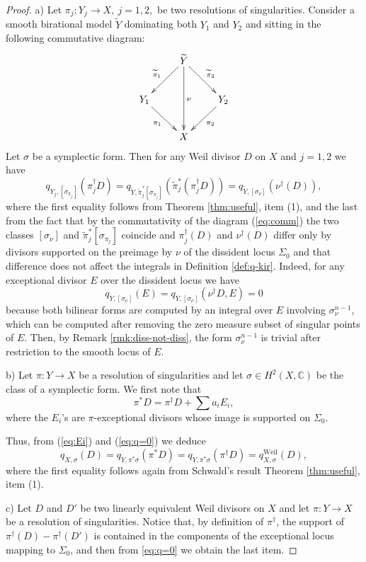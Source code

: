 \documentclass[12pt,reqno]{amsart}
\def\tilde{\widetilde}
\theoremstyle{plain}
\theoremstyle{definition}
\begin{document}
\begin{proof}
a) Let $\pi_j :Y_j\to X,\ j=1,2,$ be two resolutions of singularities. Consider a smooth birational model $\tilde Y$
dominating both $Y_1$ and $Y_2$ and sitting in the following commutative diagram:
\begin{equation}\label{eq:comm}
\xymatrix{
& \tilde Y \ar[dr]^{\tilde\pi_2}\ar[dl]_{\tilde\pi_1}\ar[dd]^{\nu} & \\
Y_1\ar[dr]_{\pi_1} & &Y_2\ar[dl]^{\pi_2}\\
& X &}
\end{equation}
Let $\sigma$ be a symplectic form.
Then for any Weil divisor $D$ on $X$ and $j=1,2$ we have
$$
q_{Y_j,[\sigma_{\pi_j}]}(\pi_j^{\dagger}D )=
q_{\tilde Y,\tilde\pi_j^*[\sigma_{\pi_j}]}(\tilde\pi_j^*(\pi_j^{\dagger}D))=
q_{\tilde Y,[\sigma_{\nu}]}(\nu^{\dagger}(D)),
$$
where the first equality follows from  Theorem \ref{thm:useful}, item (1), and the last from the fact that by the commutativity of the diagram (\ref{eq:comm}) the two classes 
$[\sigma_{\nu}]$ and $\tilde\pi_j^*[\sigma_{\pi_j}]$ coincide and $\pi_j^{\dagger}(D)$ and $\nu^{\dagger}(D)$ differ only by divisors supported on the preimage by $\nu$ of the dissident locus $\Sigma_0$ and that difference does not affect the integrals in Definition \ref{def:q-kir}.
Indeed, for any exceptional divisor $E$ over the dissident locus we have
\begin{equation}\label{eq:q=0}
q_{Y, [\sigma_{\nu}]}(E)= q_{Y, [\sigma_{\nu}]}(\nu^{\dagger}D, E) = 0
\end{equation}
because both bilinear forms are computed by an integral over $E$ involving $\sigma_{\nu}^{n-1}$, which can be computed after removing the zero measure subset of singular points of $E$. Then, by Remark \ref{rmk:diss-not-diss}, the form $\sigma_{\nu}^{n-1}$ is trivial after restriction to the smooth locus of $E$.

b) Let $\pi : Y\to X$ be a resolution of singularities and  let $\sigma\in H^2(X,\mathbb C)$ be the class of a symplectic form.
We first note that 
\begin{equation}\label{eq:Ei}
\pi^* D= \pi^{\dagger}D + \sum a_iE_i,
\end{equation}
where the $E_i$'s are $\pi$-exceptional divisors whose image is supported on $\Sigma_0$.

Thus, from (\ref{eq:Ei}) and (\ref{eq:q=0}) we deduce
$$
 q_{X,\sigma}(D)=q_{Y,\pi^*\sigma}(\pi^*D)= q_{Y,\pi^*\sigma}(\pi^\dagger D) = q_{X,\sigma}^{\textrm{Weil}}(D),
$$
where the first  equality follows again 
from Schwald's result Theorem \ref{thm:useful}, item (1).

c) Let $D$ and $D'$ be two linearly equivalent Weil divisors on $X$ and let $\pi : Y\to X$ be a resolution of singularities. Notice that, by definition of $\pi^\dagger$, the support of $\pi^\dagger(D)-\pi^\dagger(D')$ is contained in the components of the exceptional locus mapping to $\Sigma_0$, and then from \eqref{eq:q=0} we obtain the last item.  
\end{proof}
\end{document}
